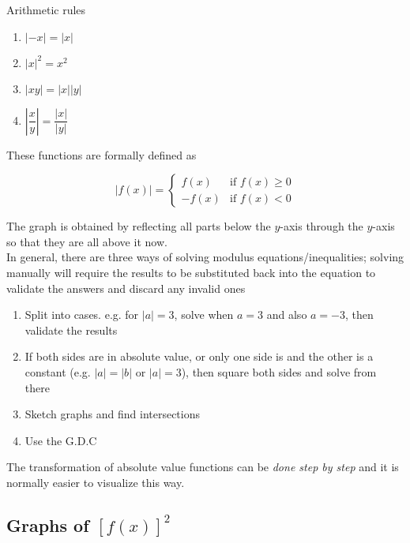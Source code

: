 \documentclass[11pt]{article}
\newcommand{\lb}{\\[8pt]}
\begin{document}
Arithmetic rules

\begin{enumerate}
  \item $|-x| = |x|$
  \item $|x|^2 = x^2$
  \item $|xy| = |x||y|$
  \item $\left|\dfrac{x}{y}\right| = \dfrac{|x|}{|y|}$
\end{enumerate}

\noindent These functions are formally defined as

$$
  |f(x)| = \left\{
  \begin{array}{ll}
    f(x)  & \mbox{if } f(x) \geq 0 \\
    -f(x) & \mbox{if } f(x) < 0
  \end{array}
  \right.
$$

\noindent The graph is obtained by reflecting all parts below the $y$-axis through the $y$-axis so that they are all above it now.\lb
In general, there are three ways of solving modulus equations/inequalities; solving manually will require the results to be substituted back into the equation to validate the answers and discard any invalid ones
\begin{enumerate}
  \item Split into cases. e.g. for $|a| = 3$, solve when $a = 3$ and also $a = -3$, then validate the results
  \item If both sides are in absolute value, or only one side is and the other is a constant (e.g. $|a| = |b|$ or $|a| = 3$), then square both sides and solve from there
  \item Sketch graphs and find intersections
  \item Use the G.D.C
\end{enumerate}
The transformation of absolute value functions can be \textit{done step by step} and it is normally easier to visualize this way.

\subsection{Graphs of \texorpdfstring{$[f(x)]^2$}{f(x) squared}}
\end{document}
